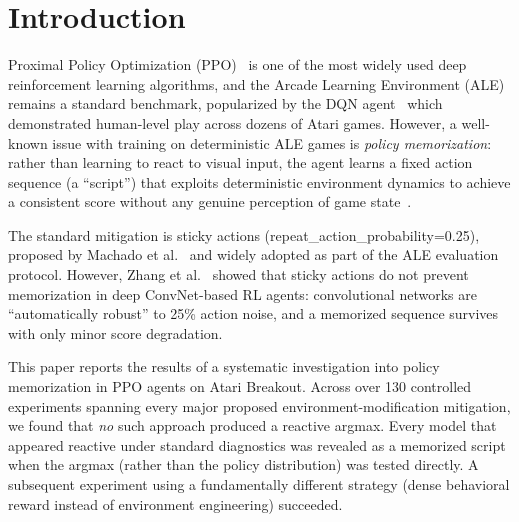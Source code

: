 \documentclass[11pt]{article}
\begin{document}
\section{Introduction}

Proximal Policy Optimization (PPO)~\cite{schulman2017ppo} is one of the most
widely used deep reinforcement learning algorithms, and the Arcade Learning
Environment (ALE)~\cite{bellemare2013ale} remains a standard benchmark, popularized
by the DQN agent~\cite{mnih2015human} which demonstrated human-level play across
dozens of Atari games. However,
a well-known issue with training on deterministic ALE games is \emph{policy
memorization}: rather than learning to react to visual input, the agent learns
a fixed action sequence (a ``script'') that exploits deterministic environment
dynamics to achieve a consistent score without any genuine perception of game
state~\cite{machado2018revisiting,zhang2018overfitting}.

The standard mitigation is sticky actions (repeat\_action\_probability=0.25),
proposed by Machado et al.~\cite{machado2018revisiting} and widely adopted as
part of the ALE evaluation protocol. However, Zhang et al.~\cite{zhang2018overfitting}
showed that sticky actions do not prevent memorization in deep ConvNet-based RL
agents: convolutional networks are ``automatically robust'' to 25\% action noise,
and a memorized sequence survives with only minor score degradation.

This paper reports the results of a systematic investigation into policy
memorization in PPO agents on Atari Breakout. Across over 130 controlled
experiments spanning every major proposed environment-modification mitigation,
we found that \emph{no} such approach produced a reactive argmax. Every model
that appeared reactive under standard diagnostics was revealed as a memorized
script when the argmax (rather than the policy distribution) was tested
directly. A subsequent experiment using a fundamentally different strategy
(dense behavioral reward instead of environment engineering) succeeded.
\end{document}
